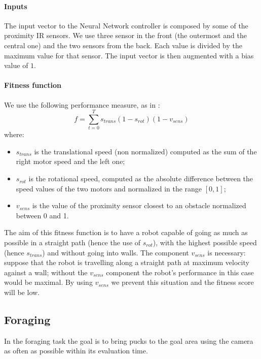 \documentclass{article}
\begin{document}
	\paragraph{Inputs} %
	\label{par:obstacle_inputs}
	The input vector to the Neural Network controller is composed by some of
	the proximity IR sensors. We use three sensor in the front (the outermost
	and the central one) and the two sensors from the back. Each value is
	divided by the maximum value for that sensor. The input vector is
	then augmented with a bias value of $1$.

	\paragraph{Fitness function} %
	\label{par:obstacle_fitness}
	We use the following performance measure, as in \cite{heinermanevolution}:
	$$f = \sum_{t=0}^{T}{s_{trans} (1 - s_{rot}) (1 - v_{sens})}$$
	where:
	\begin{itemize}
		\item $s_{trans}$ is the translational speed (non normalized)
			computed as the sum of the right motor speed and the left one;
		\item $s_{rot}$ is the rotational speed, computed as the absolute
			difference between the speed values of the two motors and normalized
			in the range $[0, 1]$;
		\item $v_{sens}$ is the value of the proximity sensor closest to an
			obstacle normalized between 0 and 1.
	\end{itemize}
	The aim of this fitness function is to have a robot capable of going as much
	as possible in a straight path (hence the use of $s_{rot}$), with the
	highest possible speed (hence $s_{trans}$) and without going into walls. The
	component $v_{sens}$ is necessary: suppose that the robot is travelling
	along a straight path at maximum velocity against a wall; without the
	$v_{sens}$ component the robot's performance in this case would be maximal.
	By using $v_{sens}$ we prevent this situation and the fitness score will be
	low.

	\subsection{Foraging} %
	\label{sub:Foraging}
	In the foraging task the goal is to bring pucks to the goal area using the
	camera as often as possible within its evaluation time.
\end{document}
